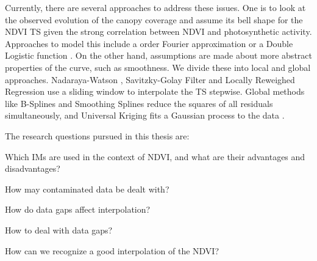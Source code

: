 Currently, there are several approaches to address these issues. One is to look at the observed evolution of the canopy coverage and assume its bell shape for the NDVI {TS} given the strong correlation between NDVI and photosynthetic activity. Approaches to model this include a  order Fourier approximation \citep{stockliEuropeanPlantPhenology2004} or a Double Logistic function \citep{beckImprovedMonitoringVegetation2006}.
On the other hand, assumptions are made about more abstract properties of the curve, such as smoothness. We divide these into local and global approaches. Nadaraya-Watson \citep{strbacEstimationEvapotrasnpirationUrban2017}, Savitzky-Golay Filter \citep{chenSimpleMethodReconstructing2004a} and Locally Reweighed Regression \citep{omoriAssessmentPaddyFields2021} use a sliding window to interpolate the {TS} stepwise. Global methods like B-Splines \citep{gurungPredictingEnhancedVegetation2009} and Smoothing Splines \citep{caiPerformanceSmoothingMethods2017} reduce the squares of all residuals simultaneously, and Universal Kriging fits a Gaussian process to the data \citep{chandolaScalableTimeSeries2010}.

\pagebreak
The research questions pursued in this thesis are:
\begin{Nenumerate}
    \item Which {{IM}}s are used in the context of NDVI, and what are their advantages and disadvantages?
    \item How may contaminated data be dealt with?
    \item How do data gaps affect interpolation?
    \item How to deal with data gaps?
    \item How can we recognize a good interpolation of the NDVI?
\end{Nenumerate}
\bigskip



